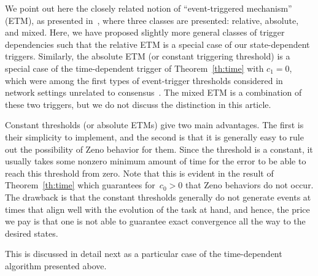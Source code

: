 \documentclass{autart}
\newcommand{\NN}{{\mathcal{N}}}
\renewcommand{\hat}{\widehat}
\begin{document}
{We point out here the closely related notion of
  ``event-triggered mechanism'' (ETM), as presented
  in~\citep{DPB-WPMHH:14}, where three classes are presented:
  relative, absolute, and mixed. Here, we have proposed slightly more
  general classes of trigger dependencies such that the relative ETM
  is a special case of our state-dependent triggers. Similarly, the
  absolute ETM (or constant triggering threshold) is a special case of
  the time-dependent trigger of Theorem~\ref{th:time} with $c_1 = 0$,
  which were among the first types of event-trigger thresholds
  considered in network settings unrelated to
  consensus~\citep{MM:06,MZ-CGC:10}. The mixed ETM is a combination of
  these two triggers, but we do not discuss the distinction in this
  article.

  Constant thresholds (or absolute ETMs) give two main advantages. The
  first is their simplicity to implement, and the second is that it is
  generally easy to rule out the possibility of Zeno behavior for
  them. Since the threshold is a constant, it usually takes some
  nonzero minimum amount of time for the error to be able to reach
  this threshold from zero. Note that this is evident in the result of
  Theorem~\ref{th:time} which guarantees for~$c_0 > 0$ that Zeno
  behaviors do not occur. The drawback is that the constant thresholds
  generally do not generate events at times that align well with the
  evolution of the task at hand, and hence, the price we pay is that
  one is not able to guarantee exact convergence all the way to the
  desired states.  } This is discussed in detail next as a particular
case of the time-dependent algorithm presented above.

\end{document}
